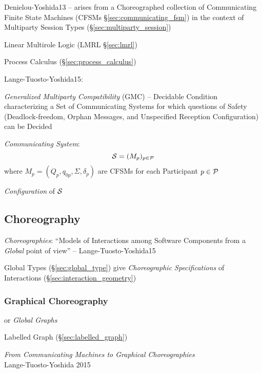 Denielou-Yoshida13 -- arises from a Choreographed collection of
Communicating Finite State Machines (CFSMs
\S\ref{sec:communicating_fsm}) in the context of Multiparty Session
Types (\S\ref{sec:multiparty_session})

Linear Multirole Logic (LMRL \S\ref{sec:lmrl})

\fist Process Calculus (\S\ref{sec:process_calculus})

Lange-Tuosto-Yoshida15:

\emph{Generalized Multiparty Compatibility} (GMC) -- Decidable
Condition characterizing a Set of Communicating Systems for which
questions of Safety (Deadlock-freedom, Orphan Messages, and
Unspecified Reception Configuration) can be Decided

\emph{Communicating System}:
\[
  \mathcal{S} = (M_p)_{p \in \mathcal{P}}
\]
where $M_p = (Q_p, q_{0p}, \Sigma, \delta_p)$ are CFSMs for each
Participant $p \in \mathcal{P}$

\emph{Configuration} of $\mathcal{S}$ %



\subsection{Choreography}\label{sec:choreography}

\emph{Choreographies}: ``Models of Interactions among Software
Components from a \emph{Global} point of view'' --
Lange-Tuosto-Yoshida15

\fist Global Types (\S\ref{sec:global_type}) give \emph{Choreographic
  Specifications} of Interactions (\S\ref{sec:interaction_geometry})



\subsubsection{Graphical Choreography}\label{sec:graphical_choreography}

or \emph{Global Graphs}

\fist Labelled Graph (\S\ref{sec:labelled_graph})

\begingroup

\newcommand{\party}{\mono}

\emph{From Communicating Machines to Graphical Choreographies} \\
Lange-Tuosto-Yoshida 2015

